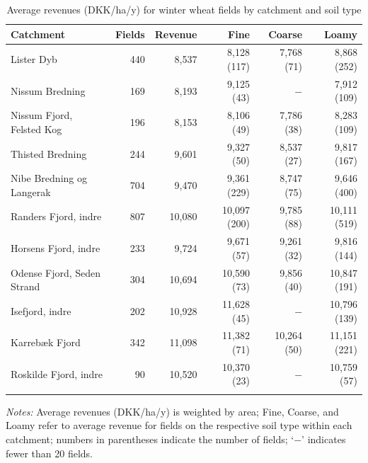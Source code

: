 \documentclass[12pt]{article}
\begin{document}
\begin{table}[H]
\centering
\small
\caption{Average revenues (DKK/ha/y) for winter wheat fields by catchment and soil type}
\label{tab:yield-vinterhvede}
\begin{threeparttable}
\begin{tabular}{lrrrrr}
\toprule
\textbf{Catchment} & \textbf{Fields} & \textbf{Revenue} & \textbf{Fine} &
\textbf{Coarse} & \textbf{Loamy} \\
\midrule\addlinespace
Lister Dyb                 & 440 & 8,537  & 8,128 (117)  & 7,768 (71)   & 8,868 (252) \\
Nissum Bredning            & 169 & 8,193  & 9,125 (43)   & $-$           & 7,912 (109) \\
Nissum Fjord, Felsted Kog  & 196 & 8,153  & 8,106 (49)   & 7,786 (38)   & 8,283 (109) \\
Thisted Bredning           & 244 & 9,601  & 9,327 (50)   & 8,537 (27)   & 9,817 (167) \\
Nibe Bredning og Langerak  & 704 & 9,470  & 9,361 (229)  & 8,747 (75)   & 9,646 (400) \\
Randers Fjord, indre       & 807 & 10,080 & 10,097 (200) & 9,785 (88)   & 10,111 (519) \\
Horsens Fjord, indre       & 233 & 9,724  & 9,671 (57)   & 9,261 (32)   & 9,816 (144) \\
Odense Fjord, Seden Strand & 304 & 10,694 & 10,590 (73)  & 9,856 (40)   & 10,847 (191) \\
Isefjord, indre            & 202 & 10,928 & 11,628 (45)  & $-$           & 10,796 (139) \\
Karrebæk Fjord             & 342 & 11,098 & 11,382 (71)  & 10,264 (50)  & 11,151 (221) \\
Roskilde Fjord, indre      &  90 & 10,520 & 10,370 (23)  & $-$           & 10,759 (57) \\
\addlinespace\bottomrule
\end{tabular}
\begin{tablenotes}
\footnotesize
\item \textit{Notes:} 
Average revenues (DKK/ha/y) is weighted by area;
Fine, Coarse, and Loamy refer to average revenue for fields on the respective
soil type within each catchment; numbers in parentheses indicate the number of
fields; `$-$' indicates fewer than 20 fields.
\end{tablenotes}
\end{threeparttable}
\end{table}
\end{document}
